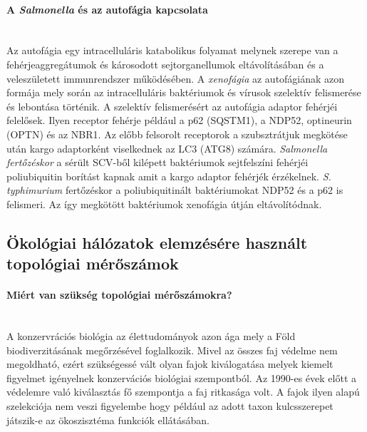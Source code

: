 \documentclass[a4paper,12pt]{article}
\begin{document}
		 \paragraph{A \textit{Salmonella} és az autofágia kapcsolata} \mbox{}\\
		 Az autofágia egy intracelluláris katabolikus folyamat melynek szerepe van a fehérjeaggregátumok és károsodott sejtorganellumok eltávolításában és a veleszületett immunrendszer működésében. A \textit{xenofágia} az autofágiának azon formája mely során az intracelluláris baktériumok és vírusok szelektív felismerése és lebontása történik. A szelektív felismerésért az autofágia adaptor fehérjéi felelősek. Ilyen receptor fehérje például a p62 (SQSTM1), a NDP52, optineurin (OPTN) és az NBR1. Az előbb felsorolt receptorok a szubsztrátjuk megkötése után kargo adaptorként viselkednek az LC3 (ATG8) számára. \textit{Salmonella fertőzéskor} a sérült SCV-ből kilépett baktériumok sejtfelszíni fehérjéi poliubiquitin borítást kapnak amit a kargo adaptor fehérjék érzékelnek. \textit{S. typhimurium} fertőzéskor a poliubiquitinált baktériumokat NDP52 és a p62 is felismeri. Az így megkötött baktériumok xenofágia útján eltávolítódnak. \cite{salmonella_authopagy_intro}
	
	\subsection{Ökológiai hálózatok elemzésére használt topológiai mérőszámok}
	 
	 \paragraph{Miért van szükség topológiai mérőszámokra?} \mbox{}\\ %
	 A konzervrációs biológia az élettudományok azon ága mely a Föld biodiverzitásának megőrzésével foglalkozik. Mivel az összes faj védelme nem megoldható, ezért szükségessé vált olyan fajok kiválogatása melyek kiemelt figyelmet igényelnek konzervációs biológiai szempontból.\cite{new_zeland} Az 1990-es évek előtt a védelemre való kiválasztás fő szempontja a faj ritkasága volt.  A fajok ilyen alapú szelekciója nem veszi figyelembe hogy például az adott taxon kulcsszerepet játszik-e az ökoszisztéma funkciók ellátásában. \cite{jordan_comparison}
	 
\end{document}
